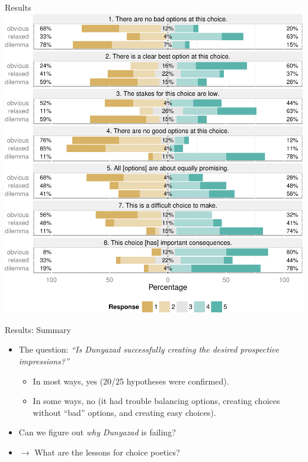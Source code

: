 \documentclass[xcolor=x11names]{beamer}
\def\dunyazad/{\textit{Dunyazad}}
\begin{document}
\begin{frame}{Results}
  \centering
  \includegraphics[height=0.85\textheight]{fig/combined-report-cropped.pdf}
\end{frame}

\begin{frame}{Results: Summary}
  \begin{itemize}\addtolength{\itemsep}{0.5\baselineskip}
    \item The question: \emph{``Is \dunyazad/ successfully creating the desired prospective impressions?''}
    \begin{itemize}\addtolength{\itemsep}{0.5\baselineskip}
      \vspace{0.5\baselineskip}
      \item In most ways, yes (20/25 hypotheses were confirmed).
      \item In some ways, no (it had trouble balancing options, creating choices without ``bad'' options, and creating easy choices).
    \end{itemize}
    \pause
    \item Can we figure out \emph{why} \dunyazad/ is failing?
    \pause
    \item $\rightarrow$ What are the lessons for choice poetics?
  \end{itemize}
\end{frame}
\end{document}
